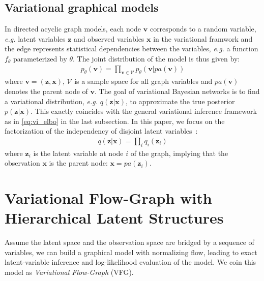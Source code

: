 \documentclass[conference]{IEEEtran}
\newcommand{\yz}[1]{{\color{red}{\bf\sf [YANG: #1]}}}
\begin{document}
\subsection{Variational graphical models}
In directed acyclic graph models, each node $\mathbf{v}$ corresponds to a random variable, \textit{e.g.} latent variables $\mathbf{z}$ and observed variables $\mathbf{x}$ in the variational framwork and the edge represents statistical dependencies between the variables, \textit{e.g.} a function $f_\theta$ parameterized by $\theta$.  The joint distribution of the model is thus given by:
\begin{align}
    p_\theta(\mathbf{v}) = \prod_{\mathbf{v} \in \mathcal{V}} p_\theta(\mathbf{v}|pa(\mathbf{v}))
\end{align}
where $\mathbf{v}=(\mathbf{z}, \mathbf{x})$, $\mathcal{V}$ is a sample space for all graph variables and $pa(\mathbf{v})$ denotes the parent node of $\mathbf{v}$. The goal of variational Bayesian networks is to find a variational distribution, \textit{e.g.} $q(\mathbf{z}|\mathbf{x})$, to approximate the true posterior $p(\mathbf{z}|\mathbf{x})$. This exactly coincides with the general variational inference framework as in \eqref{eq:vi_elbo} in the last subsection. In this paper, we focus on the factorization of the independency of disjoint latent variables~\cite{bishop2003vibes}:
\begin{align}
    q(\mathbf{z}|\mathbf{x}) = \prod_i q_i(\mathbf{z}_i)
\end{align}
where $\mathbf{z}_i$ is the latent variable at node $i$ of the graph, implying that the observation $\mathbf{x}$ is the parent node: $\mathbf{x}=pa(\mathbf{z}_i)$. 

\section{Variational Flow-Graph with Hierarchical Latent Structures}

Assume the latent space and the observation space are bridged by a sequence of variables, we can build a graphical model with normalizing flow, leading to exact latent-variable inference and log-likelihood evaluation of the model. We coin this model as \textit{Variational Flow-Graph} (VFG).
\end{document}
